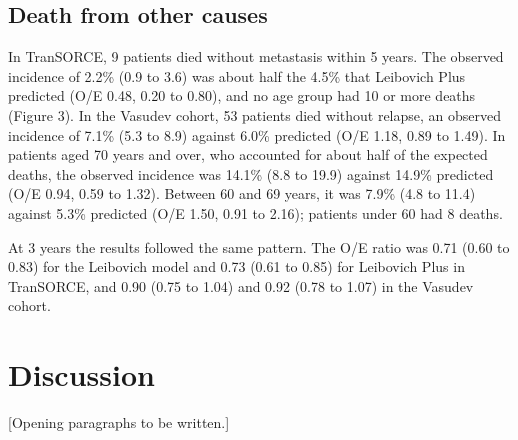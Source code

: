 \documentclass[11pt,a4paper]{article}
\begin{document}
\subsection*{Death from other causes}

In TranSORCE, 9 patients died without metastasis within 5 years.
The observed incidence of 2.2\% (0.9 to 3.6) was about half the 4.5\% that Leibovich Plus predicted (O/E 0.48, 0.20 to 0.80), and no age group had 10 or more deaths (Figure 3).
In the Vasudev cohort, 53 patients died without relapse, an observed incidence of 7.1\% (5.3 to 8.9) against 6.0\% predicted (O/E 1.18, 0.89 to 1.49).
In patients aged 70 years and over, who accounted for about half of the expected deaths, the observed incidence was 14.1\% (8.8 to 19.9) against 14.9\% predicted (O/E 0.94, 0.59 to 1.32).
Between 60 and 69 years, it was 7.9\% (4.8 to 11.4) against 5.3\% predicted (O/E 1.50, 0.91 to 2.16); patients under 60 had 8 deaths.

At 3 years the results followed the same pattern.
The O/E ratio was 0.71 (0.60 to 0.83) for the Leibovich model and 0.73 (0.61 to 0.85) for Leibovich Plus in TranSORCE, and 0.90 (0.75 to 1.04) and 0.92 (0.78 to 1.07) in the Vasudev cohort.

\section*{Discussion}

[Opening paragraphs to be written.]
\end{document}
